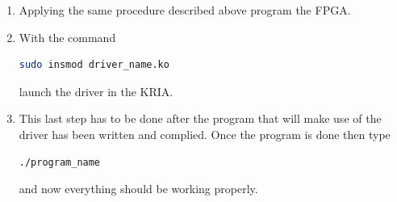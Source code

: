 \begin{enumerate}
	\item Applying the same procedure described above program the FPGA.
	
	\item With the command 
	\vspace{0.1cm}
	\begin{lstlisting}[language=bash]
		sudo insmod driver_name.ko	\end{lstlisting}
	launch the driver in the KRIA. 
	
	\item This last step has to be done after the program that will make use of the driver has been written and complied. Once the program is done then type
	\vspace{0.1cm}
	\begin{lstlisting}[language=bash]
		./program_name	\end{lstlisting}
	and now everything should be working properly.
\end{enumerate}




